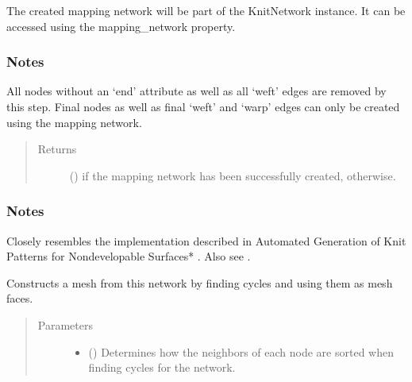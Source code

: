 \documentclass[letterpaper,10pt,english]{sphinxmanual}
\begin{document}
\begin{fulllineitems}
\begin{fulllineitems}
The created mapping network will be part of the KnitNetwork instance.
It can be accessed using the mapping\_network property.
\subsubsection*{Notes}

All nodes without an ‘end’ attribute as well as all ‘weft’ edges are
removed by this step. Final nodes as well as final ‘weft’ and ‘warp’
edges can only be created using the mapping network.
\begin{quote}\begin{description}
\item[{Returns}] \leavevmode
{} () \textendash{}  if the mapping network has been successfully created,
 otherwise.

\end{description}\end{quote}
\subsubsection*{Notes}

Closely resembles the implementation described in Automated Generation
of Knit Patterns for Non\sphinxhyphen{}developable Surfaces* \sphinxfootnotemark[1]. Also see  \sphinxfootnotemark[2].

\end{fulllineitems}


\begin{fulllineitems}
\label{\detokenize{cockatoo:cockatoo.KnitNetwork.create_mesh}}
Constructs a mesh from this network by finding cycles and using them as
mesh faces.
\begin{quote}\begin{description}
\item[{Parameters}] \leavevmode\begin{itemize}
\item {} 
 (\sphinxstyleliteralemphasis{\sphinxupquote{, }}) \textendash{} 
Determines how the neighbors of each node are sorted when finding
cycles for the network.


\end{itemize}
\end{description}
\end{quote}
\end{fulllineitems}
\end{fulllineitems}
\end{document}
